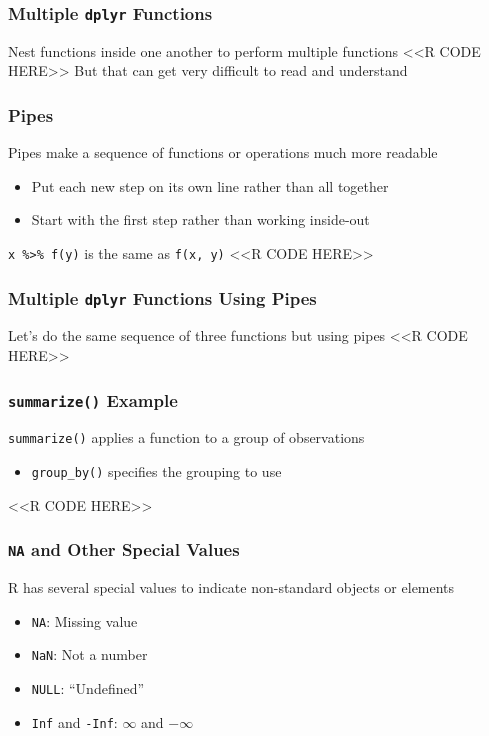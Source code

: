 \documentclass{beamer}
\begin{document}
\begin{frame}[fragile]\frametitle{Multiple \texttt{dplyr} Functions}
    Nest functions inside one another to perform multiple functions
    <<R CODE HERE>>
    \vspace{1ex}
    But that can get very difficult to read and understand
\end{frame}

\begin{frame}[fragile]\frametitle{Pipes}
    Pipes make a sequence of functions or operations much more readable
    \begin{itemize}
        \item Put each new step on its own line rather than all together
        \item Start with the first step rather than working inside-out
    \end{itemize}
    \vspace{2ex}
    \texttt{x \%>\% f(y)} is the same as \texttt{f(x, y)}
    <<R CODE HERE>>

\end{frame}

\begin{frame}[fragile]\frametitle{Multiple \texttt{dplyr} Functions Using Pipes}
    Let's do the same sequence of three functions but using pipes
    <<R CODE HERE>>
\end{frame}

\begin{frame}[fragile]\frametitle{\texttt{summarize()} Example}
    \texttt{summarize()} applies a function to a group of observations
    \begin{itemize}
        \item \texttt{group\_by()} specifies the grouping to use
    \end{itemize}
    <<R CODE HERE>>
\end{frame}

\begin{frame}[fragile]\frametitle{\texttt{NA} and Other Special Values}
    R has several special values to indicate non-standard objects or elements
    \begin{itemize}
        \item \texttt{NA}: Missing value
        \item \texttt{NaN}: Not a number
        \item \texttt{NULL}: ``Undefined''
        \item \texttt{Inf} and \texttt{-Inf}: $\infty$ and $-\infty$
    \end{itemize}
\end{frame}
\end{document}
